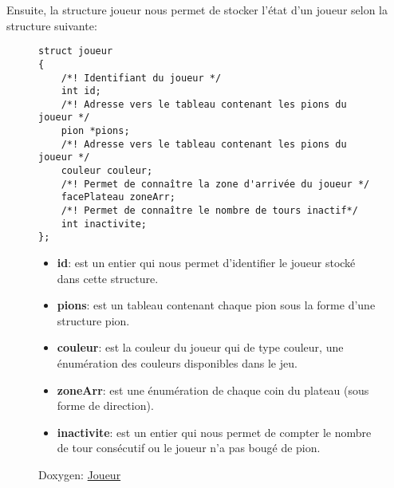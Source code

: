 \documentclass{article}
\begin{document}
        Ensuite, la structure joueur nous permet de stocker l'état d'un joueur selon la structure suivante:
        \begin{figure}[!h]
            \centering
            \begin{minipage}{8cm}
                \begin{lstlisting}
struct joueur
{
    /*! Identifiant du joueur */
    int id;
    /*! Adresse vers le tableau contenant les pions du joueur */
    pion *pions;
    /*! Adresse vers le tableau contenant les pions du joueur */
    couleur couleur;
    /*! Permet de connaître la zone d'arrivée du joueur */
    facePlateau zoneArr;
    /*! Permet de connaître le nombre de tours inactif*/
    int inactivite;
};
                \end{lstlisting}
            \end{minipage}
            \begin{minipage}{7.5cm}
                \begin{itemize}
                    \item \textbf{id}: est un entier qui nous permet d'identifier le joueur stocké dans cette structure. 
                    \item \textbf{pions}: est un tableau contenant chaque pion sous la forme d'une structure pion.
                    \item \textbf{couleur}: est la couleur du joueur qui de type couleur, une énumération des couleurs disponibles dans le jeu.
                    \item \textbf{zoneArr}: est une énumération de chaque coin du plateau (sous forme de direction). 
                    \item \textbf{inactivite}: est un entier qui nous permet de compter le nombre de tour consécutif ou le joueur n'a pas bougé de pion.
                \end{itemize}
            \end{minipage}
            \caption*{Doxygen: \href{https://obito.fr/docs/jeuTraversse/structjoueur.html}{Joueur}}
        \end{figure}
        \pagebreak
        
\end{document}
